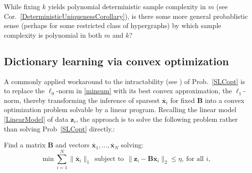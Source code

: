 \begin{question}
While fixing $k$ yields polynomial deterministic sample complexity in $m$ (see Cor.~\ref{DeterministicUniquenessCorollary}), is there some more general probablistic sense (perhaps for some restricted class of hypergraphs) by which sample complexity is polynomial in both $m$ and $k$?
\end{question}



\subsection{Dictionary learning via convex optimization}

A commonly applied workaround to the intractability (see \cite{tillmann2015computational}) of Prob.~\ref{SLCopt} is to replace the $\ell_0$-norm in \eqref{minsum} with its best convex approximation, the $\ell_1$-norm, thereby transforming the inference of sparsest $\mathbf{\overline x}_i$ for fixed $\mathbf{B}$ into a convex optimization problem solvable by a linear program. Recalling the linear model \eqref{LinearModel} of data $\mathbf{z}_i$, the approach is to solve the following problem rather than solving Prob~\ref{SLCopt} directly.:

\begin{problem}\label{ConvexifiedOptimizationProblem}
Find a matrix $\mathbf{B}$ and vectors \mbox{$\mathbf{\overline x}_1, \ldots, \mathbf{\overline x}_N$} solving:
\begin{equation}\label{l1minsum}
\min \sum_{i = 1}^N \|\mathbf{\overline x}_{i}\|_1 \ \
\text{subject to} \ \ \|\mathbf{z}_i - \mathbf{B}\mathbf{\overline x}_i\|_2 \leq \eta, \ \text{for all $i$},
\end{equation}
\end{problem}


